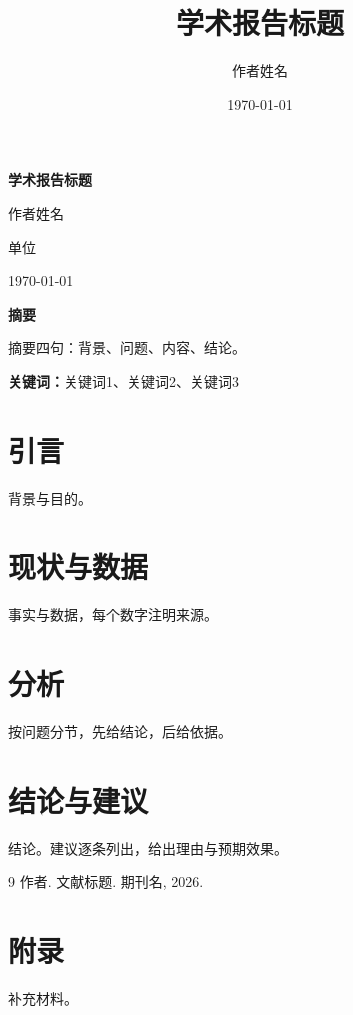\documentclass[12pt]{ctexrep}
\title{学术报告标题}
\author{作者姓名}
\date{\today}
\begin{document}
\begin{titlepage}
\centering
\vspace*{3cm}
{\LARGE\bfseries 学术报告标题\par}
\vspace{2cm}
{\large 作者姓名\par}
\vspace{1cm}
{\large 单位\par}
\vspace{1cm}
{\large \today\par}
\vfill
\end{titlepage}

\newpage
\noindent\textbf{摘要}\par
\vspace{0.5em}
摘要四句：背景、问题、内容、结论。
\par\vspace{1em}
\noindent\textbf{关键词：}关键词1、关键词2、关键词3

\tableofcontents

\chapter{引言}
\label{chap:intro}
背景与目的。

\chapter{现状与数据}
\label{chap:data}
事实与数据，每个数字注明来源。

\chapter{分析}
\label{chap:analysis}
按问题分节，先给结论，后给依据。

\chapter{结论与建议}
\label{chap:conclusion}
结论。建议逐条列出，给出理由与预期效果。

\begin{thebibliography}{9}
 作者. 文献标题. 期刊名, 2026.
\end{thebibliography}

\appendix
\chapter{附录}
\label{app:detail}
补充材料。
\end{document}
